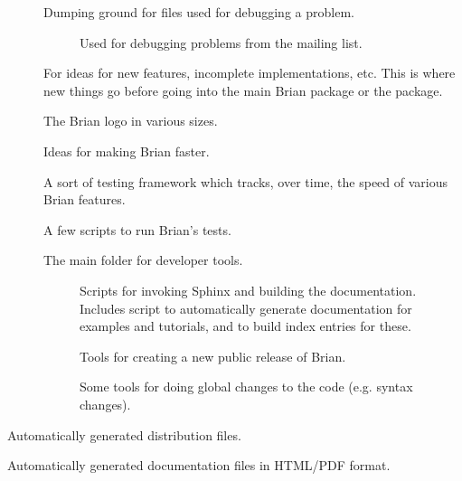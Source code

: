 \documentclass[letterpaper,10pt,english]{manual}
\begin{document}
\begin{description}
\begin{description}
\item[] \leavevmode
Dumping ground for files used for debugging a problem.
\begin{description}
\item[] \leavevmode
Used for debugging problems from the  mailing list.

\end{description}

\item[] \leavevmode
For ideas for new features, incomplete implementations, etc. This is
where new things go before going into the main Brian package or the
 package.

\item[] \leavevmode
The Brian logo in various sizes.

\item[] \leavevmode
Ideas for making Brian faster.

\item[] \leavevmode
A sort of testing framework which tracks, over time, the speed of
various Brian features.

\item[] \leavevmode
A few scripts to run Brian's tests.

\item[] \leavevmode
The main folder for developer tools.
\begin{description}
\item[] \leavevmode
Scripts for invoking Sphinx and building the documentation. Includes
script to automatically generate documentation for examples and
tutorials, and to build index entries for these.

\item[] \leavevmode
Tools for creating a new public release of Brian.

\item[] \leavevmode
Some tools for doing global changes to the code (e.g. syntax
changes).

\end{description}

\end{description}

\item[\code{dist}] \leavevmode
Automatically generated distribution files.

\item[\code{docs}] \leavevmode
Automatically generated documentation files in HTML/PDF format.


\end{description}
\end{document}
